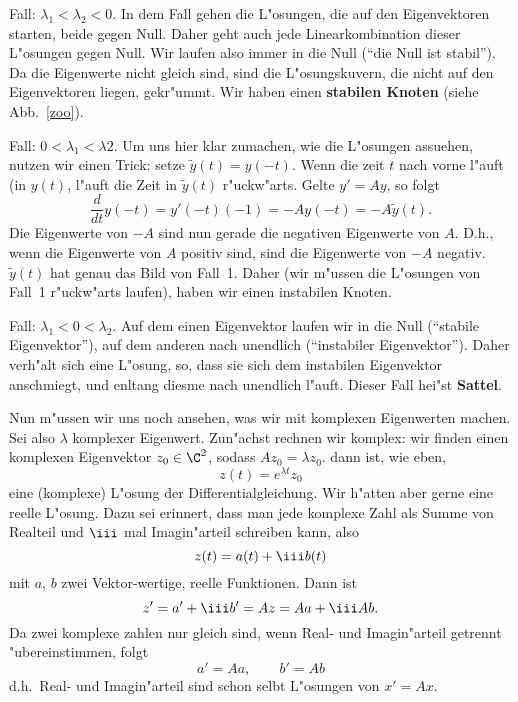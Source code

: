 Fall: $\lambda_1<\lambda_2<0$. In dem Fall gehen die L"osungen, die auf den
Eigenvektoren starten, beide gegen Null. Daher geht auch jede 
 Linearkombination dieser L"osungen gegen Null. Wir laufen also immer
in die Null (``die Null ist stabil''). Da die Eigenwerte nicht gleich sind, 
sind die L"osungskuvern, die nicht auf den Eigenvektoren liegen, gekr"ummt.
Wir haben einen {\bf stabilen Knoten} (siehe Abb.~\ref{zoo}). \par\medskip
Fall: $0<\lambda_1<\lambda2$. Um uns hier klar zumachen, wie die L"osungen
assuehen, nutzen wir einen Trick: setze $\tilde y(t)=y(-t)$. Wenn die zeit
$t$ nach vorne l"auft (in $y(t)$, l"auft die Zeit in $\tilde y(t)$ r"uckw"arts. 
Gelte $y'=Ay$, so folgt 
$$\frac d {dt} y(-t) = y'(-t)(-1) = -Ay(-t) = -A\tilde y(t).$$
Die Eigenwerte von $-A$ sind nun gerade die negativen Eigenwerte von $A$.
D.h., wenn die Eigenwerte von $A$ positiv sind, sind die Eigenwerte von $-A$ negativ. $\tilde y(t)$ hat genau das Bild von Fall~1. Daher (wir m"ussen die 
L"osungen von Fall~1 r"uckw"arts laufen), haben wir einen instabilen Knoten.\par\medskip
Fall: $\lambda_1<0<\lambda_2$. Auf dem einen Eigenvektor laufen wir in die 
Null (``stabile Eigenvektor''), auf dem anderen nach unendlich (``instabiler Eigenvektor''). Daher verh"alt sich eine L"osung, so, dass sie sich dem instabilen Eigenvektor anschmiegt, und enltang diesme nach unendlich l"auft. 
Dieser Fall hei"st {\bf Sattel}. 
\par\medskip
Nun m"ussen wir uns noch ansehen, was wir mit komplexen Eigenwerten machen. 
Sei also $\lambda$ komplexer Eigenwert.
Zun"achst rechnen wir komplex: wir finden einen komplexen Eigenvektor $z_0\in \C^2$, sodass $A z_0 = \lambda z_0$. dann ist, wie eben,
$$z(t) = e^{\lambda t} z_0$$
eine (komplexe) L"osung der Differentialgleichung. Wir h"atten aber gerne eine 
reelle L"osung. Dazu sei erinnert, dass man jede komplexe Zahl als Summe 
von Realteil und ${\iii}$ mal Imagin"arteil schreiben kann, also
$$z(t) = a(t)+\iii b(t)$$
mit $a$, $b$ zwei Vektor-wertige, reelle Funktionen. Dann ist
$$z' = a'+\iii b' = Az = Aa+\iii Ab.$$
Da zwei komplexe zahlen nur gleich sind, wenn Real- und Imagin"arteil getrennt "ubereinstimmen, folgt 
$$ a' = A a,\qquad b' = Ab$$
d.h.\ Real- und Imagin"arteil sind schon selbt L"osungen von $x'=Ax$.\par

